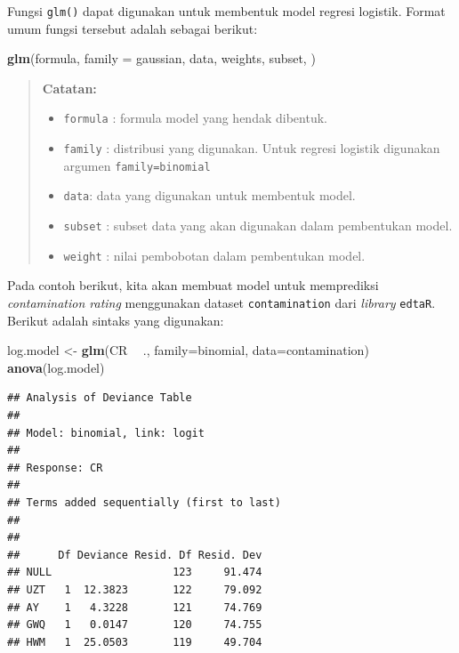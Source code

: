 \documentclass[]{book}
\newenvironment{Shaded}{\begin{snugshade}}{\end{snugshade}}
\newcommand{\DataTypeTok}[1]{\textcolor[rgb]{0.13,0.29,0.53}{#1}}
\newcommand{\KeywordTok}[1]{\textcolor[rgb]{0.13,0.29,0.53}{\textbf{#1}}}
\newcommand{\NormalTok}[1]{#1}
\newcommand{\OperatorTok}[1]{\textcolor[rgb]{0.81,0.36,0.00}{\textbf{#1}}}
\newcommand{\StringTok}[1]{\textcolor[rgb]{0.31,0.60,0.02}{#1}}
\providecommand{\tightlist}{%
  \setlength{\itemsep}{0pt}\setlength{\parskip}{0pt}}
\theoremstyle{definition}
\theoremstyle{definition}
\theoremstyle{definition}
\theoremstyle{remark}
\begin{document}
Fungsi \texttt{glm()} dapat digunakan untuk membentuk model regresi logistik. Format umum fungsi tersebut adalah sebagai berikut:

\begin{Shaded}
\begin{Highlighting}[]
\KeywordTok{glm}\NormalTok{(formula, }\DataTypeTok{family =}\NormalTok{ gaussian, data, weights, subset,}
\NormalTok{    )}
\end{Highlighting}
\end{Shaded}

\begin{quote}
\textbf{Catatan:}

\begin{itemize}
\tightlist
\item
  \texttt{formula} : formula model yang hendak dibentuk.
\item
  \texttt{family} : distribusi yang digunakan. Untuk regresi logistik digunakan argumen \texttt{family=binomial}
\item
  \texttt{data}: data yang digunakan untuk membentuk model.
\item
  \texttt{subset} : subset data yang akan digunakan dalam pembentukan model.
\item
  \texttt{weight} : nilai pembobotan dalam pembentukan model.
\end{itemize}
\end{quote}

Pada contoh berikut, kita akan membuat model untuk memprediksi \emph{contamination rating} menggunakan dataset \texttt{contamination} dari \emph{library} \texttt{edtaR}. Berikut adalah sintaks yang digunakan:

\begin{Shaded}
\begin{Highlighting}[]
\NormalTok{log.model <-}\StringTok{ }\KeywordTok{glm}\NormalTok{(CR }\OperatorTok{~}\StringTok{ }\NormalTok{., }\DataTypeTok{family=}\NormalTok{binomial, }\DataTypeTok{data=}\NormalTok{contamination)}
\KeywordTok{anova}\NormalTok{(log.model)}
\end{Highlighting}
\end{Shaded}

\begin{verbatim}
## Analysis of Deviance Table
## 
## Model: binomial, link: logit
## 
## Response: CR
## 
## Terms added sequentially (first to last)
## 
## 
##      Df Deviance Resid. Df Resid. Dev
## NULL                   123     91.474
## UZT   1  12.3823       122     79.092
## AY    1   4.3228       121     74.769
## GWQ   1   0.0147       120     74.755
## HWM   1  25.0503       119     49.704
\end{verbatim}
\end{document}
